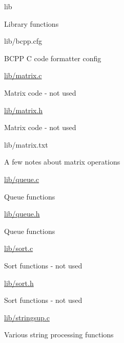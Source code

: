 \begin{DoxyItemize}
\begin{DoxyItemize}
\begin{DoxyItemize}
\end{DoxyItemize}
\end{DoxyItemize}
\item lib
\begin{DoxyItemize}
\item Library functions
\item lib/bcpp.\+cfg
\begin{DoxyItemize}
\item B\+C\+PP C code formatter config
\end{DoxyItemize}
\item \hyperlink{matrix_8c}{lib/matrix.\+c}
\begin{DoxyItemize}
\item Matrix code -\/ not used
\end{DoxyItemize}
\item \hyperlink{matrix_8h}{lib/matrix.\+h}
\begin{DoxyItemize}
\item Matrix code -\/ not used
\end{DoxyItemize}
\item lib/matrix.\+txt
\begin{DoxyItemize}
\item A few notes about matrix operations
\end{DoxyItemize}
\item \hyperlink{queue_8c}{lib/queue.\+c}
\begin{DoxyItemize}
\item Queue functions
\end{DoxyItemize}
\item \hyperlink{queue_8h}{lib/queue.\+h}
\begin{DoxyItemize}
\item Queue functions
\end{DoxyItemize}
\item \hyperlink{sort_8c}{lib/sort.\+c}
\begin{DoxyItemize}
\item Sort functions -\/ not used
\end{DoxyItemize}
\item \hyperlink{sort_8h}{lib/sort.\+h}
\begin{DoxyItemize}
\item Sort functions -\/ not used
\end{DoxyItemize}
\item \hyperlink{stringsup_8c}{lib/stringsup.\+c}
\begin{DoxyItemize}
\item Various string processing functions

\end{DoxyItemize}
\end{DoxyItemize}
\end{DoxyItemize}
